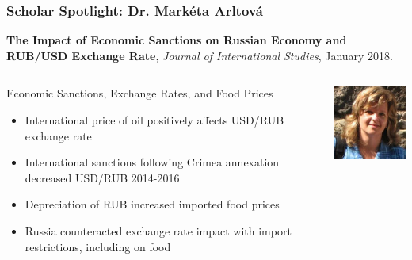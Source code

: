\documentclass[ignorenonframetext]{beamer}
\begin{document}
\begin{frame}
  \frametitle{Scholar Spotlight: Dr. Mark\'eta Arltov\'a}

  \textbf{The Impact of Economic Sanctions on Russian Economy and RUB/USD Exchange Rate}, \textit{Journal of International Studies}, January 2018.

  \vspace*{-0.25pc}\begin{columns}
    \begin{small}
    \begin{column}{0.65\textwidth}
      \begin{block}{Economic Sanctions, Exchange Rates, and Food Prices}
        \begin{itemize}[leftmargin=0pc]
          \item International price of oil positively affects USD/RUB exchange rate
          \item International sanctions following Crimea annexation decreased USD/RUB 2014-2016
          \item Depreciation of RUB increased imported food prices
          \item Russia counteracted exchange rate impact with import restrictions, including on food
        \end{itemize}
      \end{block}
    \end{column}
    \end{small}

    \begin{column}{0.3\textwidth}
      \includegraphics[width=\linewidth]{./images/arltova.jpg}


\end{column}
\end{columns}
\end{frame}
\end{document}
